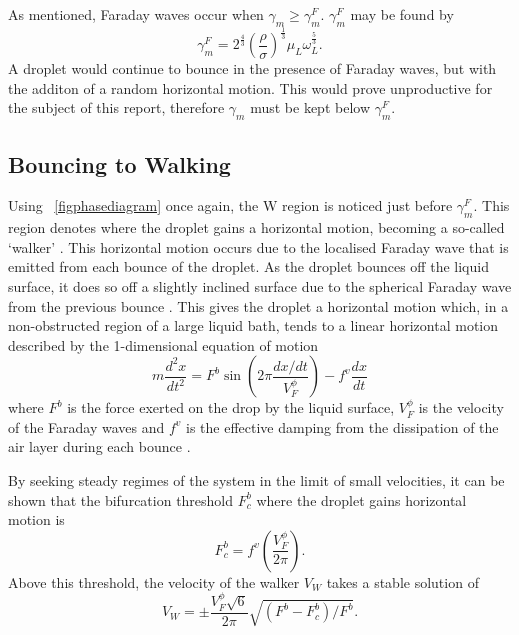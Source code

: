 \documentclass[11pt]{article}
\newcommand{\figref}[2][\figurename~]{#1\ref{#2}}
\begin{document}
As mentioned, Faraday waves occur when $\gamma_m\geq\gamma_m^F$.  $\gamma_m^F$ may be found by \cite{9}
\begin{equation}
    \label{faradaythreshold}
    \gamma_m^F=2^\frac{4}{3}\left(\frac{\rho}{\sigma}\right)^\frac{1}{3}\mu_L\omega_L^\frac{5}{3}.
\end{equation}
A droplet would continue to bounce in the presence of Faraday waves, but with the additon of a random horizontal motion.  This would prove unproductive for the subject of this report, therefore $\gamma_m$ must be kept below $\gamma_m^F$.

\subsection{Bouncing to Walking}
\label{secbouncingtowalking}

Using \figref{figphasediagram} once again, the W region is noticed just before $\gamma_m^F$.  This region denotes where the droplet gains a horizontal motion, becoming a so-called `walker' \cite{5}.  This horizontal motion occurs due to the localised Faraday wave that is emitted from each bounce of the droplet.  As the droplet bounces off the liquid surface, it does so off a slightly inclined surface due to the spherical Faraday wave from the previous bounce \cite{9}.  This gives the droplet a horizontal motion which, in a non-obstructed region of a large liquid bath, tends to a linear horizontal motion described by the 1-dimensional equation of motion
\begin{equation}
    \label{eqofmotion}
    m\frac{d^2x}{dt^2}=F^b\sin\left(2\pi\frac{dx/dt}{V_F^\phi}\right)-f^v\frac{dx}{dt}
\end{equation}
where $F^b$ is the force exerted on the drop by the liquid surface, $V_F^\phi$ is the velocity of the Faraday waves and $f^v$ is the effective damping from the dissipation of the air layer during each bounce \cite{9}.

By seeking steady regimes of the system in the limit of small velocities, it can be shown that the bifurcation threshold $F^b_c$ where the droplet gains horizontal motion is
\begin{equation}
    \label{walkingthreshold}
    F^b_c=f^v\left(\frac{V_F^\phi}{2\pi}\right).
\end{equation}
Above this threshold, the velocity of the walker $V_W$ takes a stable solution of
\begin{equation}
\label{walkervelocity}
V_W=\pm\frac{V_F^\phi\sqrt{6}}{2\pi}\sqrt{\left(F^b-F_c^b\right)/F^b}.
\end{equation}
\end{document}
